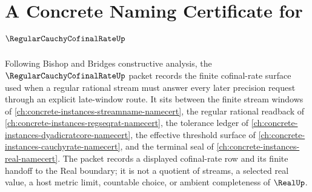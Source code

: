 \chapter{A Concrete Naming Certificate for $\RegularCauchyCofinalRateUp$}
\label{ch:concrete-instances-regular-cauchy-cofinal-rate-namecert}

Following Bishop and Bridges constructive analysis, the $\RegularCauchyCofinalRateUp$ packet records the finite cofinal-rate surface used when a regular rational stream must answer every later precision request through an explicit late-window route. It sits between the finite stream windows of \autoref{ch:concrete-instances-streamname-namecert}, the regular rational readback of \autoref{ch:concrete-instances-regseqrat-namecert}, the tolerance ledger of \autoref{ch:concrete-instances-dyadicratcore-namecert}, the effective threshold surface of \autoref{ch:concrete-instances-cauchyrate-namecert}, and the terminal seal of \autoref{ch:concrete-instances-real-namecert}. The packet records a displayed cofinal-rate row and its finite handoff to the Real boundary; it is not a quotient of streams, a selected real value, a host metric limit, countable choice, or ambient completeness of $\RealUp$.

